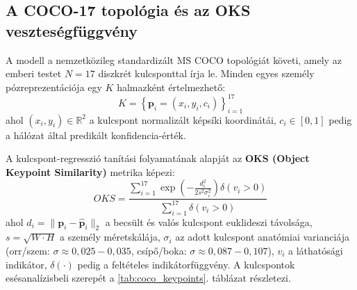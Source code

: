 \documentclass[12pt,a4paper,oneside]{report}
\begin{document}
\subsection{A COCO-17 topológia és az OKS veszteségfüggvény}
A modell a nemzetközileg standardizált MS COCO topológiát \cite{coco2014} követi, amely az emberi testet $N = 17$ diszkrét kulcsponttal írja le. Minden egyes személy pózreprezentációja egy $K$ halmazként értelmezhető:
\begin{equation}
    K = \left\{ \mathbf{p}_i = (x_i, y_i, c_i) \right\}_{i=1}^{17}
\end{equation}
ahol $(x_i, y_i) \in \mathbb{R}^2$ a kulcspont normalizált képsíki koordinátái, $c_i \in [0, 1]$ pedig a hálózat által predikált konfidencia-érték.

A kulcspont-regresszió tanítási folyamatának alapját az \textbf{OKS (Object Keypoint Similarity)} metrika képezi:
\begin{equation}
    OKS = \frac{\sum_{i=1}^{17} \exp\left( - \frac{d_i^2}{2 s^2 \sigma_i^2} \right) \delta(v_i > 0)}{\sum_{i=1}^{17} \delta(v_i > 0)}
\end{equation}
ahol $d_i = \|\mathbf{p}_i - \hat{\mathbf{p}}_i\|_2$ a becsült és valós kulcspont euklideszi távolsága, $s = \sqrt{W \cdot H}$ a személy méretskálája, $\sigma_i$ az adott kulcspont anatómiai varianciája (orr/szem: $\sigma \approx 0{,}025-0{,}035$, csípő/boka: $\sigma \approx 0{,}087-0{,}107$), $v_i$ a láthatósági indikátor, $\delta(\cdot)$ pedig a feltételes indikátorfüggvény. A kulcspontok esésanalízisbeli szerepét a \ref{tab:coco_keypoints}. táblázat részletezi.
\end{document}
